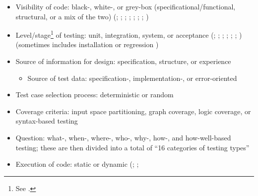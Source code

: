 \begin{itemize}
      \item Visibility of code: black-, white-, or grey-box
            (specificational/functional, structural, or a mix of the two)
            (\citealp[p.~8]{IEEE2021}; \citealp[pp.~5-10,~5-16]{SWEBOK2024};
            \citealp[p.~601, called ``testing approaches'' and (stepwise) code
                  reading replaced ``grey-box testing'']{SharmaEtAl2021};
            \citealp[pp.~57-58]{AmmannAndOffutt2017};
            \citealp[p.~213]{KuļešovsEtAl2013};
            \citealp[pp.~53,~218]{Patton2006}; \citealp[p.~69]{Perry2006};
            \citealp[pp.~4-5, called ``testing methods'']{Kam2008})
      \item Level/stage\footnote{See .} of testing:
            unit, integration, system, or acceptance
            (\citealp[pp.~5-6 to 5-7]{SWEBOK2024}; ;
            \citealp[p.~218]{KuļešovsEtAl2013} ;
            \citealp{Patton2006}; \citealp{Perry2006};
            \citealp{PetersAndPedrycz2000}; \citealp[pp.~9,~13]{Gerrard2000a})
            (sometimes includes installation \citep[p.~439]{vanVliet2000} or
            regression \citep[p.~3]{BarbosaEtAl2006})
      \item Source of information for design: specification, structure, or
            experience \citep[p.~8]{IEEE2021}
            \begin{itemize}
                  \item Source of test data: specification-, implementation-,
                        or error-oriented \citep[p.~440]{PetersAndPedrycz2000}
            \end{itemize}
      \item Test case selection process: deterministic or random
            \citep[p.~5-16]{SWEBOK2024}
      \item Coverage criteria: input space partitioning, graph coverage, logic
            coverage, or syntax-based testing \citep[pp.~18-19]{AmmannAndOffutt2017}
      \item Question: what-, when-, where-, who-, why-, how-, and how-well-based
            testing; these are then divided into a total of ``16 categories of
            testing types''
            \citep[p.~17]{Firesmith2015}
      \item Execution of code: static or dynamic
            (\citealp[p.~214]{KuļešovsEtAl2013}; \citealp[p.~12]{Gerrard2000a};

\end{itemize}
